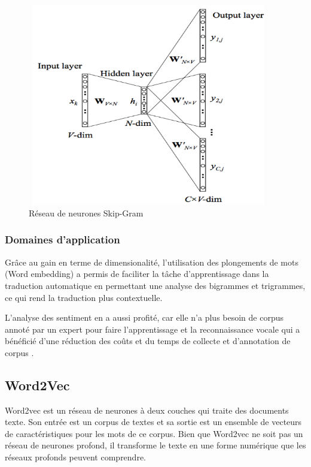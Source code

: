 \begin{itemize}
     \begin{figure}[H]
        \centering
        \includegraphics[height=250pt,width=300pt]{img/chapter2/Skip-Gram.png}
        \caption{Réseau de neurones Skip-Gram}
        \label{cbow2}
    \end{figure}
    
    \end{itemize}

    \subsubsection{Domaines d'application}
    Grâce au gain en terme de dimensionalité, l'utilisation des plongements de mots (Word embedding) a permis de faciliter la tâche d'apprentissage dans la traduction automatique \cite{we2} en permettant une analyse des bigrammes et trigrammes, ce qui rend la traduction plus contextuelle.

    L'analyse des sentiment en a aussi profité, car elle n'a plus besoin de corpus annoté par un expert pour faire l'apprentissage \cite{we3} et la reconnaissance vocale qui a bénéficié d'une réduction des coûts et du temps de collecte et d'annotation de corpus \cite{we4}.
       
 
    \subsection{Word2Vec}
    Word2vec est un réseau de neurones à deux couches qui traite des documents texte. Son entrée est un corpus de textes et sa sortie est un ensemble de vecteurs de caractéristiques pour les mots de ce corpus. Bien que Word2vec ne soit pas un réseau de neurones profond, il transforme le texte en une forme numérique que les réseaux profonds peuvent comprendre. 

